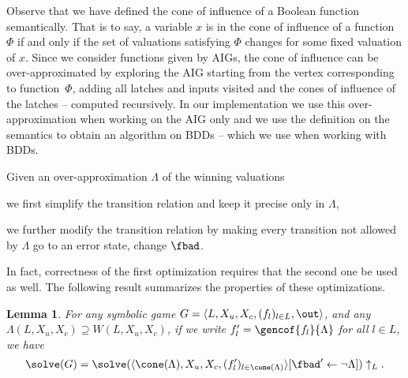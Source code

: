 \documentclass[submission,copyright,creativecommons]{eptcs}
\newtheorem{lemma}{Lemma}
\begin{document}
Observe that we have defined the cone of influence of a Boolean function
semantically. That is to say, a variable $x$ is in the cone of
influence of a function $\Phi$ if and only if the set of valuations satisfying
$\Phi$ changes for some fixed valuation of $x$. Since we consider functions
given by AIGs, the cone of influence can be over-approximated by
exploring the AIG starting from the vertex corresponding to function~$\Phi$,
adding all latches and inputs visited and the cones of influence of the latches
-- computed recursively. In our implementation we use this over-approximation
when working on the AIG only and we use the definition on the semantics to
obtain an algorithm on BDDs -- which we use when working with BDDs.

Given an over-approximation $\Lambda$ of the winning valuations
\begin{inparaenum}[$(i)$]
\item we first simplify the transition relation and keep it precise only in
	$\Lambda$,
\item we further modify the transition relation by making every transition not
	allowed by $\Lambda$ go to an error state, \ie change
	$\fbad$.
\end{inparaenum}
In fact, correctness of the first optimization requires that the second one be
used as well. The following result summarizes the properties of these
optimizations.
\begin{lemma}\label{lem:correct-restrict}
	For any symbolic game $G = \langle L, X_u, X_c, (f_l)_{l \in L}, \out
	\rangle$, and any $\Lambda(L,X_u,X_c) \supseteq W(L,X_u,X_c)$, if we
	write $f'_l = \gencof{f_l}{\Lambda}$ for all $l \in L$, we have
	\[
		\solve(G) = 
		\solve(\langle \cone(\Lambda), X_u, X_c, (f'_l)_{l \in
		\cone(\Lambda)}\rangle[\fbad' \leftarrow \lnot \Lambda])
			\uparrow_L.
	\]
\end{lemma}
\end{document}
